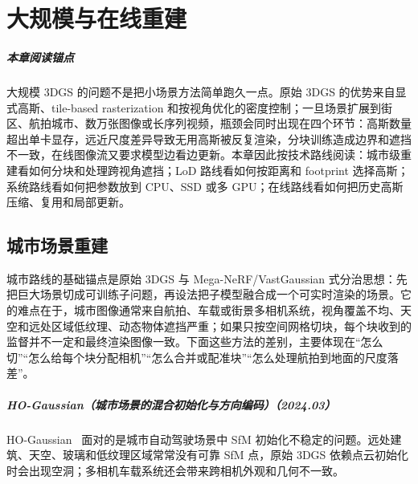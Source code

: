 \chapter{大规模与在线重建}

\paragraph*{本章阅读锚点}
大规模 3DGS 的问题不是把小场景方法简单跑久一点。原始 3DGS 的优势来自显式高斯、tile-based rasterization 和按视角优化的密度控制；一旦场景扩展到街区、航拍城市、数万张图像或长序列视频，瓶颈会同时出现在四个环节：高斯数量超出单卡显存，远近尺度差异导致无用高斯被反复渲染，分块训练造成边界和遮挡不一致，在线图像流又要求模型边看边更新。本章因此按技术路线阅读：城市级重建看如何分块和处理跨视角遮挡；LoD 路线看如何按距离和 footprint 选择高斯；系统路线看如何把参数放到 CPU、SSD 或多 GPU；在线路线看如何把历史高斯压缩、复用和局部更新。

\section{城市场景重建}

城市路线的基础锚点是原始 3DGS 与 Mega-NeRF/VastGaussian 式分治思想：先把巨大场景切成可训练子问题，再设法把子模型融合成一个可实时渲染的场景。它的难点在于，城市图像通常来自航拍、车载或街景多相机系统，视角覆盖不均、天空和远处区域低纹理、动态物体遮挡严重；如果只按空间网格切块，每个块收到的监督并不一定和最终渲染图像一致。下面这些方法的差别，主要体现在“怎么切”“怎么给每个块分配相机”“怎么合并或配准块”“怎么处理航拍到地面的尺度落差”。



\paragraph{HO-Gaussian（城市场景的混合初始化与方向编码）（2024.03）}
HO-Gaussian~\cite{2403_20032} 面对的是城市自动驾驶场景中 SfM 初始化不稳定的问题。远处建筑、天空、玻璃和低纹理区域常常没有可靠 SfM 点，原始 3DGS 依赖点云初始化时会出现空洞；多相机车载系统还会带来跨相机外观和几何不一致。

